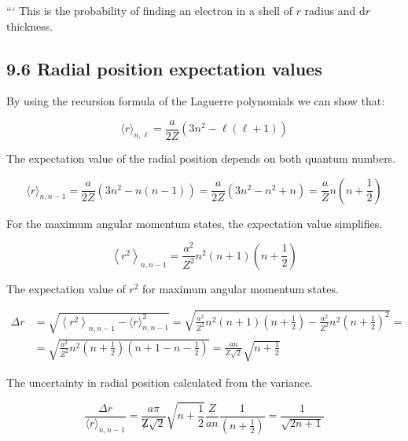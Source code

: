 \documentclass[italian]{HKNdocument}
\begin{document}
```
This is the probability of finding an electron in a shell of $r$ radius and $\mathrm{d} r$ thickness.

\subsection*{9.6 Radial position expectation values}
By using the recursion formula of the Laguerre polynomials we can show that:

\begin{equation*}
\langle r\rangle_{n, \ell}=\frac{a}{2 Z}\left(3 n^{2}-\ell(\ell+1)\right) \tag{9.100}
\end{equation*}

The expectation value of the radial position depends on both quantum numbers.

\begin{equation*}
\langle r\rangle_{n, n-1}=\frac{a}{2 Z}\left(3 n^{2}-n(n-1)\right)=\frac{a}{2 Z}\left(3 n^{2}-n^{2}+n\right)=\frac{a}{Z} n\left(n+\frac{1}{2}\right) \tag{9.101}
\end{equation*}

For the maximum angular momentum states, the expectation value simplifies.

\begin{equation*}
\left\langle r^{2}\right\rangle_{n, n-1}=\frac{a^{2}}{Z^{2}} n^{2}(n+1)\left(n+\frac{1}{2}\right) \tag{9.102}
\end{equation*}

The expectation value of $r^2$ for maximum angular momentum states.

\begin{align*}
\Delta r & =\sqrt{\left\langle r^{2}\right\rangle_{n, n-1}-\langle r\rangle_{n, n-1}^{2}}=\sqrt{\frac{a^{2}}{Z^{2}} n^{2}(n+1)\left(n+\frac{1}{2}\right)-\frac{a^{2}}{Z^{2}} n^{2}\left(n+\frac{1}{2}\right)^{2}}= \\
& =\sqrt{\frac{a^{2}}{Z^{2}} n^{2}\left(n+\frac{1}{2}\right)\left(n+1-n-\frac{1}{2}\right)}=\frac{a n}{Z \sqrt{2}} \sqrt{n+\frac{1}{2}} \tag{9.103}
\end{align*}

The uncertainty in radial position calculated from the variance.

\begin{equation*}
\frac{\Delta r}{\langle r\rangle_{n, n-1}}=\frac{a \pi}{\not Z \sqrt{2}} \sqrt{n+\frac{1}{2}} \frac{Z}{a n} \frac{1}{\left(n+\frac{1}{2}\right)}=\frac{1}{\sqrt{2 n+1}} \tag{9.104}
\end{equation*}
\end{document}
